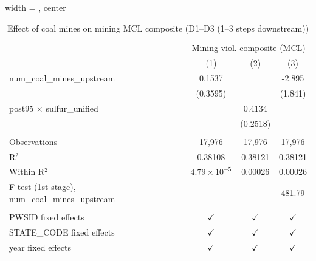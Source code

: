 
\begin{table}[htbp]
   
   \caption{\label{2sls_4step_d1_d3_mining_mcl_composite} Effect of coal mines on mining MCL composite (D1--D3 (1--3 steps downstream))}
   \bigskip
   
   \centering
   
   \begin{adjustbox}{width = \textwidth, center}
      
      
      \begin{tabular}{lccc}
         \toprule
         
          & \multicolumn{3}{c}{Mining viol. composite (MCL)}\\
         
                                                           & (1)                   & (2)           & (3)\\  
         
         \midrule 
         num\_coal\_mines\_upstream                        & 0.1537                &               & -2.895\\   
                                                           & (0.3595)              &               & (1.841)\\   
         post95 $\times$ sulfur\_unified                   &                       & 0.4134        &   \\   
                                                           &                       & (0.2518)      &   \\   
         
          \\
         
         Observations                                      & 17,976                & 17,976        & 17,976\\  
         R$^2$                                             & 0.38108               & 0.38121       & 0.38121\\  
         Within R$^2$                                      & $4.79\times 10^{-5}$  & 0.00026       & 0.00026\\  
         F-test (1st stage), num\_coal\_mines\_upstream    &                       &               & 481.79\\  
         
          \\
         
         PWSID fixed effects                               & $\checkmark$          & $\checkmark$  & $\checkmark$\\   
         STATE\_CODE fixed effects                         & $\checkmark$          & $\checkmark$  & $\checkmark$\\   
         year fixed effects                                & $\checkmark$          & $\checkmark$  & $\checkmark$\\   
         

\end{tabular}
\end{adjustbox}
\end{table}
